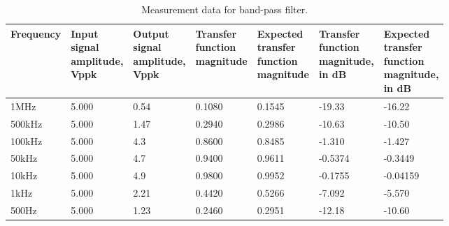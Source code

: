 \begin{table}[H]
	\centering
	\begin{tabular}{|l|l|l|l|l|l|l|}
	\hline
	Frequency&\makecell[l]{Input\\signal\\amplitude,\\Vppk}&\makecell[l]{Output\\signal\\amplitude,\\Vppk}&\makecell[l]{Transfer\\function\\magnitude}&\makecell[l]{Expected\\transfer\\function\\magnitude}&\makecell[l]{Transfer\\function\\magnitude,\\in dB}&\makecell[l]{Expected\\transfer\\function\\magnitude,\\in dB}\\
	\hline
	1MHz&5.000&0.54&0.1080&0.1545&-19.33&-16.22\\
	\hline
	500kHz&5.000&1.47&0.2940&0.2986&-10.63&-10.50\\
	\hline
	100kHz&5.000&4.3&0.8600&0.8485&-1.310&-1.427\\
	\hline
	50kHz&5.000&4.7&0.9400&0.9611&-0.5374&-0.3449\\
	\hline
	10kHz&5.000&4.9&0.9800&0.9952&-0.1755&-0.04159\\
	\hline
	1kHz&5.000&2.21&0.4420&0.5266&-7.092&-5.570\\
	\hline
	500Hz&5.000&1.23&0.2460&0.2951&-12.18&-10.60\\
	\hline
	\end{tabular}
	\caption{Measurement data for band-pass filter.}
\end{table}
